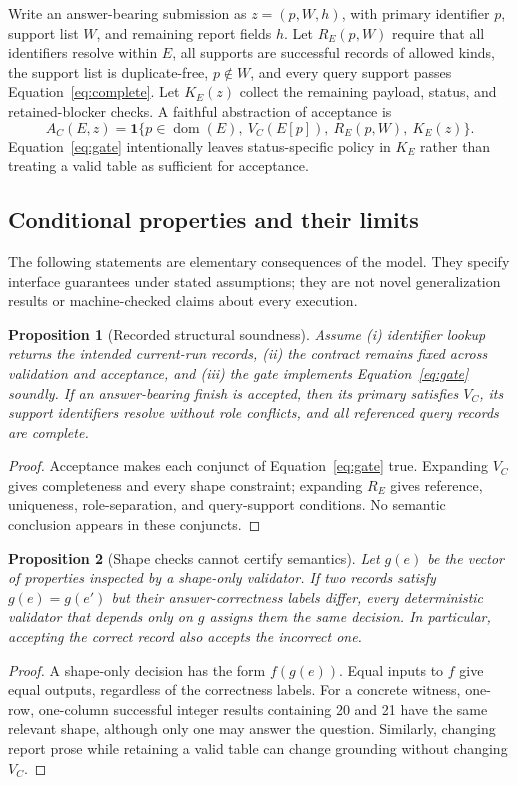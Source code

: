\documentclass{article}
\newtheorem{proposition}{Proposition}
\newcommand{\ind}{\mathbf{1}}
\begin{document}
Write an answer-bearing submission as $z=(p,W,h)$, with primary identifier $p$, support list $W$, and remaining report fields $h$. Let $R_E(p,W)$ require that all identifiers resolve within $E$, all supports are successful records of allowed kinds, the support list is duplicate-free, $p\notin W$, and every query support passes Equation~\eqref{eq:complete}. Let $K_E(z)$ collect the remaining payload, status, and retained-blocker checks. A faithful abstraction of acceptance is
\begin{equation}
A_C(E,z)=\ind\{p\in\operatorname{dom}(E),\ V_C(E[p]),\ R_E(p,W),\ K_E(z)\}.
\label{eq:gate}
\end{equation}
Equation~\eqref{eq:gate} intentionally leaves status-specific policy in $K_E$ rather than treating a valid table as sufficient for acceptance.

\subsection{Conditional properties and their limits}
\label{sec:theory}
The following statements are elementary consequences of the model. They specify interface guarantees under stated assumptions; they are not novel generalization results or machine-checked claims about every execution.

\begin{proposition}[Recorded structural soundness]
\label{prop:sound}
Assume (i) identifier lookup returns the intended current-run records, (ii) the contract remains fixed across validation and acceptance, and (iii) the gate implements Equation~\eqref{eq:gate} soundly. If an answer-bearing finish is accepted, then its primary satisfies $V_C$, its support identifiers resolve without role conflicts, and all referenced query records are complete.
\end{proposition}
\begin{proof}
Acceptance makes each conjunct of Equation~\eqref{eq:gate} true. Expanding $V_C$ gives completeness and every shape constraint; expanding $R_E$ gives reference, uniqueness, role-separation, and query-support conditions. No semantic conclusion appears in these conjuncts.
\end{proof}

\begin{proposition}[Shape checks cannot certify semantics]
\label{prop:semantic}
Let $g(e)$ be the vector of properties inspected by a shape-only validator. If two records satisfy $g(e)=g(e')$ but their answer-correctness labels differ, every deterministic validator that depends only on $g$ assigns them the same decision. In particular, accepting the correct record also accepts the incorrect one.
\end{proposition}
\begin{proof}
A shape-only decision has the form $f(g(e))$. Equal inputs to $f$ give equal outputs, regardless of the correctness labels. For a concrete witness, one-row, one-column successful integer results containing 20 and 21 have the same relevant shape, although only one may answer the question. Similarly, changing report prose while retaining a valid table can change grounding without changing $V_C$.
\end{proof}
\end{document}
